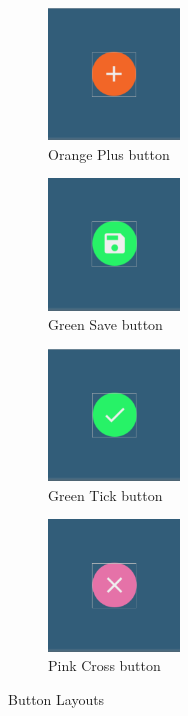 \documentclass{article}
\begin{document}
\bigskip
\begin{figure}[h]
\centering
\begin{subfigure}{.5\textwidth}
  \centering
  \includegraphics[width=3.5cm]{orange_plus.png}
  \caption{Orange Plus button}
  \label{fig:orange_plus_button_layout}
\end{subfigure}%
\begin{subfigure}{.5\textwidth}
  \centering
  \includegraphics[width=3.5cm]{green_save.png}
  \caption{Green Save button}
  \label{fig:green_save_button_layout}
\end{subfigure}
\begin{subfigure}{.5\textwidth}
  \centering
  \includegraphics[width=3.5cm]{green_tick.png}
  \caption{Green Tick button}
  \label{fig:green_tick_button_layout}
\end{subfigure}%
\begin{subfigure}{.5\textwidth}
  \centering
  \includegraphics[width=3.5cm]{pink_cross.png}
  \caption{Pink Cross button}
  \label{fig:pink_cross_button_layout}
\end{subfigure}%
\caption{Button Layouts}
\label{fig:button_layouts}
\end{figure}
\end{document}
